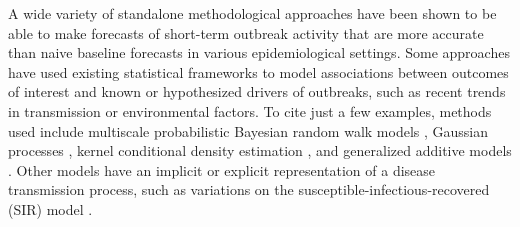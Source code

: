 \documentclass[11pt,3p,review,authoryear]{elsarticle}
\begin{document}
A wide variety of standalone methodological approaches have been shown to be able to make forecasts of short-term outbreak activity that are more accurate than naive baseline forecasts in various epidemiological settings. 
Some approaches have used existing statistical frameworks to model associations between outcomes of interest and known or hypothesized drivers of outbreaks, such as recent trends in transmission or environmental factors.
To cite just a few examples, methods used include multiscale probabilistic Bayesian random walk models \citep{osthus_multiscale_2021}, Gaussian processes \citep{johnson_phenomenological_2018}, kernel conditional density estimation \citep{ray_infectious_2017,brooks_nonmechanistic_2018}, and generalized additive models \citep{lauer_prospective_2018}.
Other models have an implicit or explicit representation of a disease transmission process, such as variations on the susceptible-infectious-recovered (SIR) model \citep{shaman_forecasting_2012,lega_data-driven_2016,osthus_forecasting_2017,pei_forecasting_2018,turtle_accurate_2021}.
\end{document}
